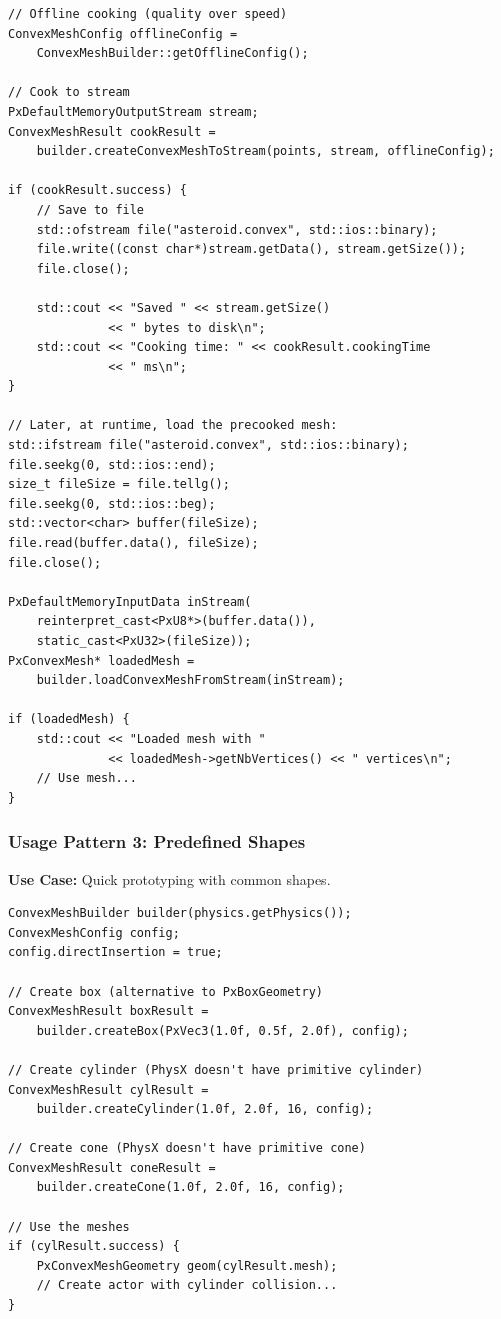 \begin{lstlisting}[caption={Offline cooking with file serialization}]
// Offline cooking (quality over speed)
ConvexMeshConfig offlineConfig =
    ConvexMeshBuilder::getOfflineConfig();

// Cook to stream
PxDefaultMemoryOutputStream stream;
ConvexMeshResult cookResult =
    builder.createConvexMeshToStream(points, stream, offlineConfig);

if (cookResult.success) {
    // Save to file
    std::ofstream file("asteroid.convex", std::ios::binary);
    file.write((const char*)stream.getData(), stream.getSize());
    file.close();

    std::cout << "Saved " << stream.getSize()
              << " bytes to disk\n";
    std::cout << "Cooking time: " << cookResult.cookingTime
              << " ms\n";
}

// Later, at runtime, load the precooked mesh:
std::ifstream file("asteroid.convex", std::ios::binary);
file.seekg(0, std::ios::end);
size_t fileSize = file.tellg();
file.seekg(0, std::ios::beg);
std::vector<char> buffer(fileSize);
file.read(buffer.data(), fileSize);
file.close();

PxDefaultMemoryInputData inStream(
    reinterpret_cast<PxU8*>(buffer.data()),
    static_cast<PxU32>(fileSize));
PxConvexMesh* loadedMesh =
    builder.loadConvexMeshFromStream(inStream);

if (loadedMesh) {
    std::cout << "Loaded mesh with "
              << loadedMesh->getNbVertices() << " vertices\n";
    // Use mesh...
}
\end{lstlisting}

\subsubsection{Usage Pattern 3: Predefined Shapes}

\textbf{Use Case:} Quick prototyping with common shapes.

\begin{lstlisting}[caption={Using predefined shape generators}]
ConvexMeshBuilder builder(physics.getPhysics());
ConvexMeshConfig config;
config.directInsertion = true;

// Create box (alternative to PxBoxGeometry)
ConvexMeshResult boxResult =
    builder.createBox(PxVec3(1.0f, 0.5f, 2.0f), config);

// Create cylinder (PhysX doesn't have primitive cylinder)
ConvexMeshResult cylResult =
    builder.createCylinder(1.0f, 2.0f, 16, config);

// Create cone (PhysX doesn't have primitive cone)
ConvexMeshResult coneResult =
    builder.createCone(1.0f, 2.0f, 16, config);

// Use the meshes
if (cylResult.success) {
    PxConvexMeshGeometry geom(cylResult.mesh);
    // Create actor with cylinder collision...
}
\end{lstlisting}

